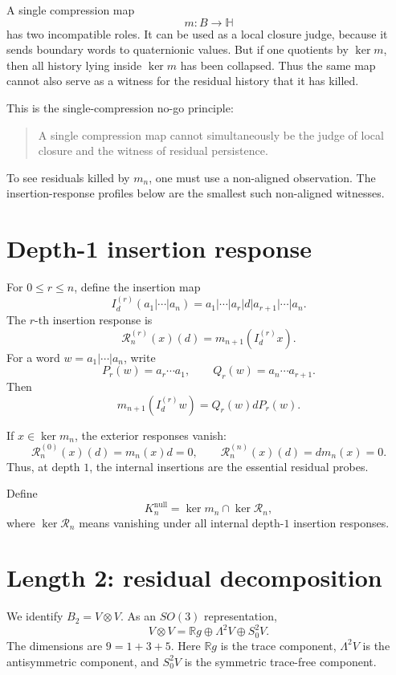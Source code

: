 \documentclass[11pt]{article}
\theoremstyle{definition}
\newcommand{\Ker}{\operatorname{ker}}
\begin{document}
A single compression map
\[
  m:B\to\mathbb{H}
\]
has two incompatible roles.
It can be used as a local closure judge, because it sends boundary words to quaternionic values.
But if one quotients by $\Ker m$, then all history lying inside $\Ker m$ has been collapsed.
Thus the same map cannot also serve as a witness for the residual history that it has killed.

This is the single-compression no-go principle:

\begin{quote}
A single compression map cannot simultaneously be the judge of local closure and the witness of residual persistence.
\end{quote}

To see residuals killed by $m_n$, one must use a non-aligned observation.
The insertion-response profiles below are the smallest such non-aligned witnesses.

\section{Depth-1 insertion response}

For $0\le r\le n$, define the insertion map
\[
  I_d^{(r)}(a_1|\cdots|a_n)
  =a_1|\cdots|a_r|d|a_{r+1}|\cdots|a_n.
\]
The $r$-th insertion response is
\[
  \mathcal{R}_n^{(r)}(x)(d)=m_{n+1}(I_d^{(r)}x).
\]
For a word $w=a_1|\cdots|a_n$, write
\[
  P_r(w)=a_r\cdots a_1,
  \qquad
  Q_r(w)=a_n\cdots a_{r+1}.
\]
Then
\[
  m_{n+1}(I_d^{(r)}w)=Q_r(w)dP_r(w).
\]

If $x\in\Ker m_n$, the exterior responses vanish:
\[
  \mathcal{R}_n^{(0)}(x)(d)=m_n(x)d=0,
  \qquad
  \mathcal{R}_n^{(n)}(x)(d)=dm_n(x)=0.
\]
Thus, at depth $1$, the internal insertions are the essential residual probes.

Define
\[
  K_n^{\mathrm{null}}
  =
  \Ker m_n\cap\Ker \mathcal{R}_n,
\]
where $\Ker \mathcal{R}_n$ means vanishing under all internal depth-$1$ insertion responses.

\section{Length 2: residual decomposition}

We identify $B_2=V\otimes V$.
As an $SO(3)$ representation,
\[
  V\otimes V=\mathbb{R}g\oplus\Lambda^2V\oplus S^2_0V.
\]
The dimensions are $9=1+3+5$.
Here $\mathbb{R}g$ is the trace component, $\Lambda^2V$ is the antisymmetric component, and $S^2_0V$ is the symmetric trace-free component.
\end{document}
